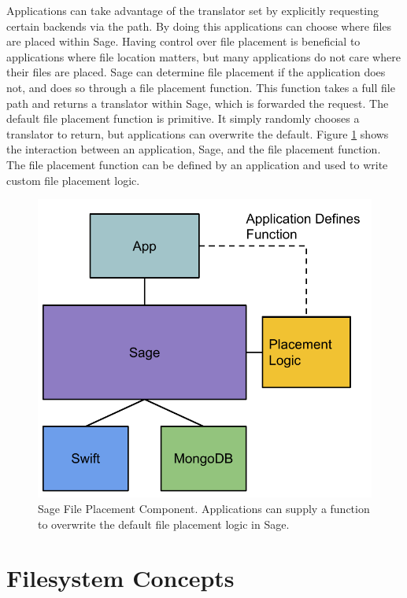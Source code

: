 Applications can take advantage of the translator set by explicitly requesting certain backends via the path. By doing this applications can choose where files are placed within Sage. Having control over file placement is beneficial to applications where file location matters, but many applications do not care where their files are placed. Sage can determine file placement if the application does not, and does so through a file placement function. This function takes a full file path and returns a translator within Sage, which is forwarded the request. The default file placement function is primitive. It simply randomly chooses a translator to return, but applications can overwrite the default. Figure \ref{fig:fileplacement} shows the interaction between an application, Sage, and the file placement function. The file placement function can be defined by an application and used to write custom file placement logic.


\begin{figure}[h!]
\centering
\includegraphics[scale=0.7]{figures/fileplacement}
\caption[Sage File Placement Component]{Sage File Placement Component. Applications can supply a function to overwrite the default file placement logic in Sage.}
\label{fig:fileplacement}
\end{figure}


\section{Filesystem Concepts}


